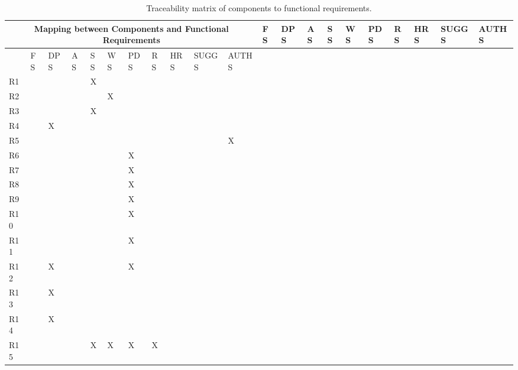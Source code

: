 \documentclass{article}
\begin{document}
\begin{longtable}[c]{|m{0.10cm}|m{0.10cm}|m{0.10cm}|m{0.10cm}|m{0.05cm}|m{0.10cm}|m{0.10cm}|m{0.10cm}|m{0.10cm}|m{0.10cm}|m{0.10cm}|}
 \caption{Traceability matrix of components to functional requirements.}
 \label{comp-req mapping}
 \hline
 \multicolumn{11}{|c|}{\cellcolor{white}Mapping between Components and Functional Requirements}
 \endfirsthead
 \hline
  \cellcolor{yellow!30} &\cellcolor{white}FS & \cellcolor{white}DPS & \cellcolor{white}AS & \cellcolor{white}SS & \cellcolor{white}WS & \cellcolor{white}PDS & \cellcolor{white}RS & \cellcolor{white}HRS & \cellcolor{white}SUGGS & \cellcolor{white}AUTHS \\
 \endhead
 \endfoot
 \endlastfoot
 \hline
  \cellcolor{yellow!30} & \cellcolor{white}FS & \cellcolor{white}DPS & \cellcolor{white}AS & \cellcolor{white}SS & \cellcolor{white}WS & \cellcolor{white}PDS & \cellcolor{white}RS & \cellcolor{white}HRS & \cellcolor{white}SUGGS & \cellcolor{white}AUTHS \\
 \hline
 R1 &   &  &  &  X &  &   &  &   &  &  \\
 \hline
 R2 &  &  &  &   &X  &   &  &   &  &   \\
 \hline
 R3 &  &  &  & X  &  &   &  &   &  &   \\
 \hline
 R4 &  & X &  &  &  &   &  &   &  &   \\
 \hline
 R5 &  &   &   &   &   &   &  &   & & X   \\
 \hline
 R6 &  &   &   &   &   & X  &   &   &   &   \\
 \hline
 R7 &  &   &   &   &   &  X &   &   &  &    \\
 \hline
 R8 &  &   &   &   &   & X  &   &   &  &   \\
 \hline
 R9 &   &  &   &   &   & X  &   &   &  &    \\
 \hline
 R10 &   &  &  &   &   & X  &   &   &  &   \\
 \hline
 R11 &   &  &  &   &   &  X &   &   &  &    \\
 \hline
 R12 &    & X  &  &   &   & X  &   &   & &  \\
 \hline
 R13 &    & X  &  &   &   &   &   &   &  & \\
 \hline
 R14 &    & X  &  &   &   &   &   &   &  & \\
 \hline
 R15 &   &  &   & X  & X  & X  & X  &   &  &    \\

\end{longtable}
\end{document}
